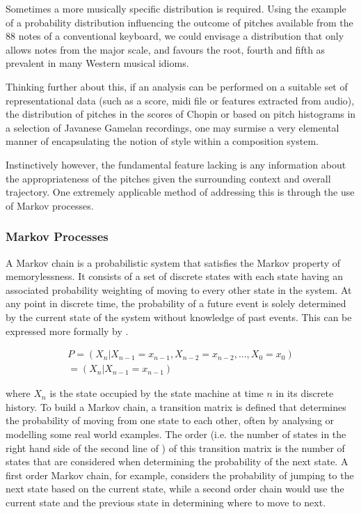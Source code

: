 Sometimes a more musically specific distribution is required. Using the example of a probability distribution influencing the outcome of pitches available from the 88 notes of a conventional keyboard, we could envisage a distribution that only allows notes from the major scale, and favours the root, fourth and fifth as prevalent in many Western musical idioms.

Thinking further about this, if an analysis can be performed on a suitable set of representational data (such as a score, \acrshort{midi} file or features extracted from audio), the distribution of pitches in the scores of Chopin or based on pitch histograms in a selection of Javanese Gamelan recordings, one may surmise a very elemental manner of encapsulating the notion of style within a composition system. 

Instinctively however, the fundamental feature lacking is any information about the appropriateness of the pitches given the surrounding context and overall trajectory. One extremely applicable method of addressing this is through the use of Markov processes.

\subsubsection{Markov Processes}
\label{sec:markov_chains}

A Markov chain is a probabilistic system that satisfies the Markov property of memorylessness. It consists of a set of discrete states with each state having an associated probability weighting of moving to every other state in the system. At any point in discrete time, the probability of a future event is solely determined by the current state of the system without knowledge of past events. This can be expressed more formally by .

\begin{equation}
  \label{eq:markov}
  \begin{gathered}
P=(X_{n}|X_{n-1}=x_{n-1},X_{n-2}=x_{n-2},...,X_{0}=x_{0}) \\
=(X_{n}|X_{n-1}=x_{n-1})
  \end{gathered}
\end{equation}

where $X_n$ is the state occupied by the state machine at time $n$ in its discrete history. To build a Markov chain, a transition matrix is defined that determines the probability of moving from one state to each other, often by analysing or modelling some real world examples. The order (i.e. the number of states in the right hand side of the second line of ) of this transition matrix is the number of states that are considered when determining the probability of the next state. A first order Markov chain, for example, considers the probability of jumping to the next state based on the current state, while a second order chain would use the current state and the previous state in determining where to move to next.

